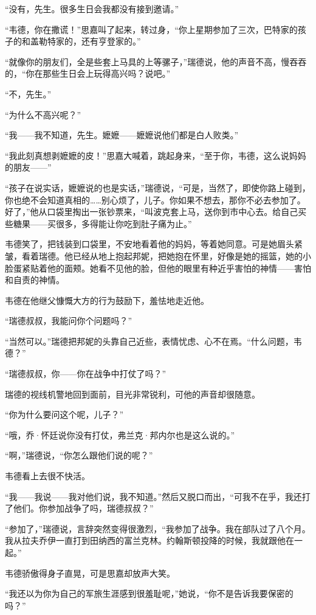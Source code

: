 \par “没有，先生。很多生日会我都没有接到邀请。”
\par “韦德，你在撒谎！”思嘉叫了起来，转过身，“你上星期参加了三次，巴特家的孩子的和盖勒特家的，还有亨登家的。”
\par “就像你的朋友们，全是些套上马具的上等骡子，”瑞德说，他的声音不高，慢吞吞的，“你在那些生日会上玩得高兴吗？说吧。”
\par “不，先生。”
\par “为什么不高兴呢？”
\par “我——我不知道，先生。嬷嬷——嬷嬷说他们都是白人败类。”
\par “我此刻真想剥嬷嬷的皮！”思嘉大喊着，跳起身来，“至于你，韦德，这么说妈妈的朋友——”
\par “孩子在说实话，嬷嬷说的也是实话，”瑞德说，“可是，当然了，即使你路上碰到，你也绝不会知道真相的……别心烦了，儿子。你如果不想去，那你不必去参加了。好了，”他从口袋里掏出一张钞票来，“叫波克套上马，送你到市中心去。给自己买些糖果——买很多，多得能让你吃到肚子痛为止。”
\par 韦德笑了，把钱装到口袋里，不安地看着他的妈妈，等着她同意。可是她眉头紧皱，看着瑞德。他已经从地上抱起邦妮，把她抱在怀里，好像是她的摇篮，她的小脸蛋紧贴着他的面颊。她看不见他的脸，但他的眼里有种近乎害怕的神情——害怕和自责的神情。
\par 韦德在他继父慷慨大方的行为鼓励下，羞怯地走近他。
\par “瑞德叔叔，我能问你个问题吗？”
\par “当然可以。”瑞德把邦妮的头靠自己近些，表情忧虑、心不在焉。“什么问题，韦德？”
\par “瑞德叔叔，你——你在战争中打仗了吗？”
\par 瑞德的视线机警地回到面前，目光非常锐利，可他的声音却很随意。
\par “你为什么要问这个呢，儿子？”
\par “哦，乔·怀廷说你没有打仗，弗兰克·邦内尔也是这么说的。”
\par “啊，”瑞德说，“你怎么跟他们说的呢？”
\par 韦德看上去很不快活。
\par “我——我说——我对他们说，我不知道。”然后又脱口而出，“可我不在乎，我还打了他们。你参加战争了吗，瑞德叔叔？”
\par “参加了，”瑞德说，言辞突然变得很激烈，“我参加了战争。我在部队过了八个月。我从拉夫乔伊一直打到田纳西的富兰克林。约翰斯顿投降的时候，我就跟他在一起。”
\par 韦德骄傲得身子直晃，可是思嘉却放声大笑。
\par “我还以为你为自己的军旅生涯感到很羞耻呢，”她说，“你不是告诉我要保密的吗？”
